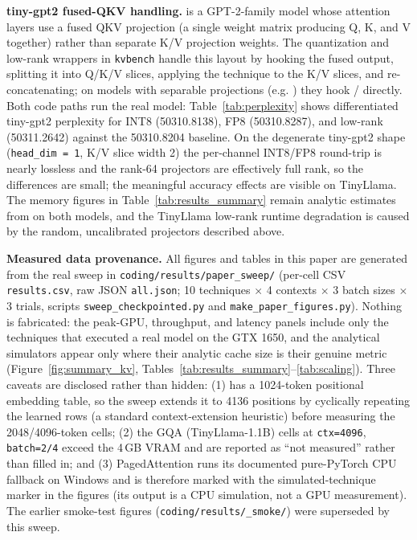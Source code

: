 \documentclass[conference]{IEEEtran}
\begin{document}
{\noindent\textbf{tiny-gpt2 fused-QKV handling.}  is a GPT-2-family model whose attention layers use a fused QKV projection (a single  weight matrix producing Q, K, and V together) rather than separate K/V projection weights. The quantization and low-rank wrappers in \texttt{kvbench} handle this layout by hooking the fused  output, splitting it into Q/K/V slices, applying the technique to the K/V slices, and re-concatenating; on models with separable projections (e.g. ) they hook / directly. Both code paths run the real model: Table~\ref{tab:perplexity} shows differentiated tiny-gpt2 perplexity for INT8 (50310.8138), FP8 (50310.8287), and low-rank (50311.2642) against the 50310.8204 baseline. On the degenerate tiny-gpt2 shape (\texttt{head\_dim = 1}, K/V slice width 2) the per-channel INT8/FP8 round-trip is nearly lossless and the rank-64 projectors are effectively full rank, so the differences are small; the meaningful accuracy effects are visible on TinyLlama. The memory figures in Table~\ref{tab:results_summary} remain analytic estimates from  on both models, and the TinyLlama low-rank runtime degradation is caused by the random, uncalibrated projectors described above.

\noindent\textbf{Measured data provenance.} All figures and tables in this paper are generated from the real sweep in \texttt{coding/results/paper\_sweep/} (per-cell CSV \texttt{results.csv}, raw JSON \texttt{all.json}; 10 techniques $\times$ 4 contexts $\times$ 3 batch sizes $\times$ 3 trials, scripts \texttt{sweep\_checkpointed.py} and \texttt{make\_paper\_figures.py}). Nothing is fabricated: the peak-GPU, throughput, and latency panels include only the techniques that executed a real model on the GTX 1650, and the analytical simulators appear only where their analytic cache size is their genuine metric (Figure~\ref{fig:summary_kv}, Tables~\ref{tab:results_summary}--\ref{tab:scaling}). Three caveats are disclosed rather than hidden: (1)  has a 1024-token positional embedding table, so the sweep extends it to 4136 positions by cyclically repeating the learned rows (a standard context-extension heuristic) before measuring the 2048/4096-token cells; (2) the GQA (TinyLlama-1.1B) cells at \texttt{ctx=4096}, \texttt{batch=2/4} exceed the 4\,GB VRAM and are reported as ``not measured'' rather than filled in; and (3) PagedAttention runs its documented pure-PyTorch CPU fallback on Windows and is therefore marked with the simulated-technique marker in the figures (its output is a CPU simulation, not a GPU measurement). The earlier smoke-test figures (\texttt{coding/results/\_smoke/}) were superseded by this sweep.

}
\end{document}
